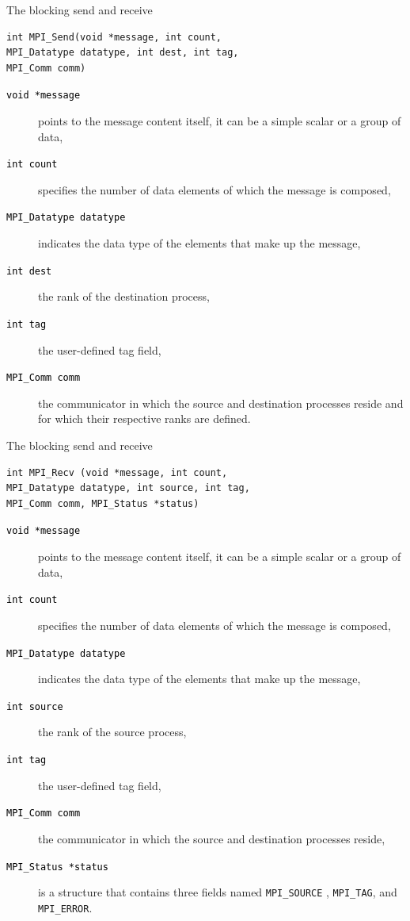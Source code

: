 \documentclass[xcolor={svgnames,usenames}]{beamer}
\begin{document}
\begin{frame}[fragile]{The blocking send and receive}
\begin{verbatim}
int MPI_Send(void *message, int count, 
MPI_Datatype datatype, int dest, int tag, 
MPI_Comm comm)
\end{verbatim}
\begin{description}
\item[\textcolor{black}{\texttt{void *message}}] points to the message content itself, it can be a simple scalar or a group of data,
\item[\textcolor{black}{\texttt{int count}}] specifies the number of data elements of which the message is composed,
\item[\textcolor{black}{\texttt{MPI_Datatype datatype}}] indicates the \alert{data type} of the elements that make up the message,
\item[\textcolor{black}{\texttt{int dest}}] the rank of the destination process, 
\item[\textcolor{black}{\texttt{int tag}}] the user-defined tag field, 
\item[\textcolor{black}{\texttt{MPI_Comm comm}}] the communicator in which the source and destination processes reside and for which their respective
ranks are defined.
\end{description}
\end{frame}

\begin{frame}[fragile]{The blocking send and receive}
\begin{verbatim}
int MPI_Recv (void *message, int count, 
MPI_Datatype datatype, int source, int tag,
MPI_Comm comm, MPI_Status *status)
\end{verbatim}
\begin{description}
\item[\textcolor{black}{\texttt{void *message}}] points to the message content itself, it can be a simple scalar or a group of data,
\item[\textcolor{black}{\texttt{int count}}] specifies the number of data elements of which the message is composed,
\item[\textcolor{black}{\texttt{MPI_Datatype datatype}}] indicates the \alert{data type} of the elements that make up the message,
\item[\textcolor{black}{\texttt{int source}}] the rank of the source process, 
\item[\textcolor{black}{\texttt{int tag}}] the user-defined tag field, 
\item[\textcolor{black}{\texttt{MPI_Comm comm}}] the communicator in which the source and destination processes reside,
\item[\textcolor{black}{\texttt{MPI_Status *status}}] is a structure that contains three fields named \texttt{MPI_SOURCE} , \texttt{MPI_TAG}, and \texttt{MPI_ERROR}.
\end{description}
\end{frame}
\end{document}
